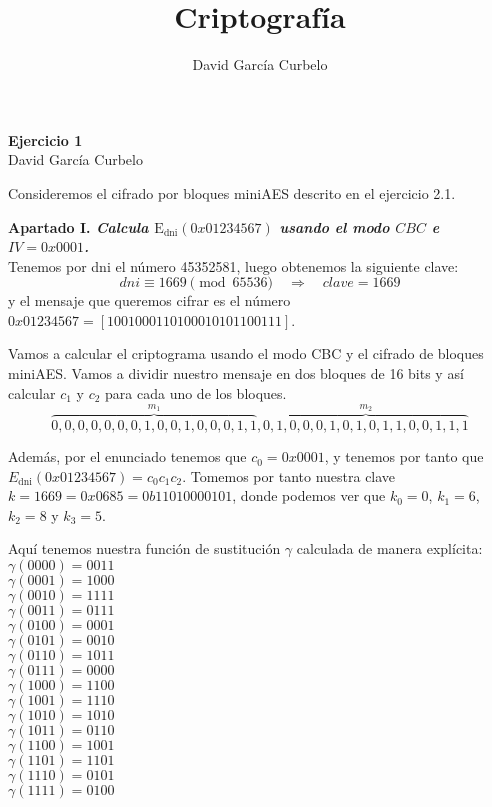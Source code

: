 \documentclass[fleqn]{article}
\author{David García Curbelo}
\title{Criptografía}
\def\next{\quad \Rightarrow \quad}
\begin{document}
    \begin{center}
        \LARGE{\textbf{Ejercicio 1}} \\
        \Large{David García Curbelo} \\
    \end{center}

    \vspace{1cm}

    Consideremos el cifrado por bloques miniAES descrito en el ejercicio 2.1.


    \textbf{Apartado I. \textit{Calcula $\text{E}_{\text{dni}}(0x01234567)$ usando el modo $CBC$ e $IV = 0x0001$.}}\\

    Tenemos por dni el número 45352581, luego obtenemos la siguiente clave:
    $$dni \equiv 1669 \pmod{65536} \next clave=1669$$
    y el mensaje que queremos cifrar es el número $0x01234567 = [1001000110100010101100111]$.
    
    Vamos a calcular el criptograma usando el modo CBC y el cifrado de bloques miniAES. Vamos a dividir nuestro mensaje 
    en dos bloques de 16 bits y así calcular $c_1$ y $c_2$ para cada uno de los bloques.
    $$\overbrace{0,0,0,0,0,0,0,1,0,0,1,0,0,0,1,1}^{m_1},\overbrace{0,1,0,0,0,1,0,1,0,1,1,0,0,1,1,1}^{m_2} $$

    Además, por el enunciado tenemos que $c_0 = 0x0001$, y tenemos por tanto que $E_{\text{dni}}(0x01234567) = c_0 c_1 c_2$.
    Tomemos por tanto nuestra clave $k = 1669 = 0x0685 = 0b11010000101$, donde podemos ver que $k_0 = 0$, $k_1 = 6$, $k_2 = 8$ 
    y $k_3 = 5$.

    Aquí tenemos nuestra función de sustitución $\gamma$ calculada de manera explícita: \\
    $\gamma(0000) = 0011$ \\
    $\gamma(0001) = 1000$ \\	
    $\gamma(0010) = 1111$ \\
    $\gamma(0011) = 0111$ \\
    $\gamma(0100) = 0001$ \\
    $\gamma(0101) = 0010$ \\
    $\gamma(0110) = 1011$ \\
    $\gamma(0111) = 0000$ \\
    $\gamma(1000) = 1100$ \\
    $\gamma(1001) = 1110$ \\
    $\gamma(1010) = 1010$ \\
    $\gamma(1011) = 0110$ \\
    $\gamma(1100) = 1001$ \\
    $\gamma(1101) = 1101$ \\
    $\gamma(1110) = 0101$ \\
    $\gamma(1111) = 0100$ \\
    
\end{document}
